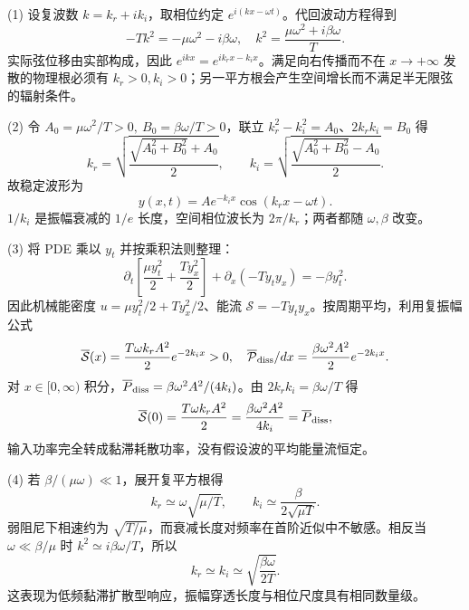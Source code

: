 (1) 设复波数 \(k=k_r+ik_i\)，取相位约定 \(e^{i(kx-\omega t)}\)。代回波动方程得到
\[
-Tk^2=-\mu\omega^2-i\beta\omega,\quad
k^2=\frac{\mu\omega^2+i\beta\omega}{T}.
\]
实际弦位移由实部构成，因此 \(e^{ikx}=e^{ik_rx-k_ix}\)。满足向右传播而不在 \(x\to+\infty\) 发散的物理根必须有 \(k_r>0,k_i>0\)；另一平方根会产生空间增长而不满足半无限弦的辐射条件。

(2) 令 \(A_0=\mu\omega^2/T>0,\ B_0=\beta\omega/T>0\)，联立 \(k_r^2-k_i^2=A_0\)、\(2k_rk_i=B_0\) 得
\[
k_r=\sqrt{\frac{\sqrt{A_0^2+B_0^2}+A_0}{2}},\qquad
k_i=\sqrt{\frac{\sqrt{A_0^2+B_0^2}-A_0}{2}}.
\]
故稳定波形为
\[
y(x,t)=A e^{-k_ix}\cos(k_rx-\omega t).
\]
\(1/k_i\) 是振幅衰减的 \(1/e\) 长度，空间相位波长为 \(2\pi/k_r\)；两者都随 \(\omega,\beta\) 改变。

(3) 将 PDE 乘以 \(y_t\) 并按乘积法则整理：
\[
\partial_t\left[\frac{\mu y_t^2}{2}+\frac{T y_x^2}{2}\right]
+\partial_x(-T y_ty_x)=-\beta y_t^2.
\]
因此机械能密度 \(u=\mu y_t^2/2+Ty_x^2/2\)、能流 \(\mathcal S=-Ty_ty_x\)。按周期平均，利用复振幅公式
\[
\overline{\mathcal S}(x)=\frac{T\omega k_r A^2}{2}e^{-2k_ix}>0,
\quad
\overline{\mathcal P}_{\rm diss}/dx
=\frac{\beta\omega^2A^2}{2}e^{-2k_ix}.
\]
对 \(x\in[0,\infty)\) 积分，\(\overline P_{\rm diss}=\beta\omega^2A^2/(4k_i)\)。由 \(2k_rk_i=\beta\omega/T\) 得
\[
\overline{\mathcal S}(0)=\frac{T\omega k_rA^2}{2}
=\frac{\beta\omega^2A^2}{4k_i}
=\overline P_{\rm diss},
\]
输入功率完全转成黏滞耗散功率，没有假设波的平均能量流恒定。

(4) 若 \(\beta/(\mu\omega)\ll1\)，展开复平方根得
\[
k_r\simeq\omega\sqrt{\mu/T},\qquad
k_i\simeq\frac{\beta}{2\sqrt{\mu T}}.
\]
弱阻尼下相速约为 \(\sqrt{T/\mu}\)，而衰减长度对频率在首阶近似中不敏感。相反当 \(\omega\ll\beta/\mu\) 时 \(k^2\simeq i\beta\omega/T\)，所以
\[
k_r\simeq k_i\simeq\sqrt{\frac{\beta\omega}{2T}}.
\]
这表现为低频黏滞扩散型响应，振幅穿透长度与相位尺度具有相同数量级。
